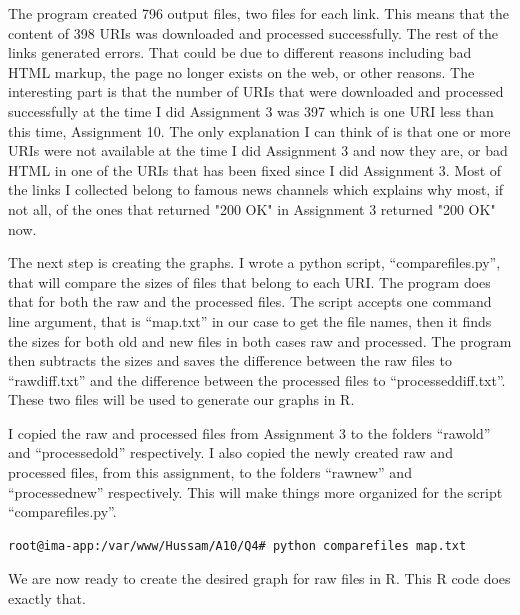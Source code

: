 \documentclass[a4paper, 11pt]{article}
\begin{document}
The program created 796 output files, two files for each link. This means that the content of 398 URIs was downloaded and processed successfully. The rest of the links generated errors. That could be due to different reasons including bad HTML markup, the page no longer exists on the web, or other reasons. The interesting part is that the number of URIs that were downloaded and processed successfully at the time I did Assignment 3 was 397 which is one URI less than this time, Assignment 10. The only explanation I can think of is that one or more URIs were not available at the time I did Assignment 3 and now they are, or bad HTML in one of the URIs that has been fixed since I did Assignment 3. Most of the links I collected belong to famous news channels which explains why most, if not all, of the ones that returned "200 OK" in Assignment 3 returned "200 OK" now.

The next step is creating the graphs. I wrote a python script, ``comparefiles.py'', that will compare the sizes of files that belong to each URI. The program does that for both the raw and the processed files. The script accepts one command line argument, that is ``map.txt'' in our case to get the file names, then it finds the sizes for both old and new files in both cases raw and processed. The program then subtracts the sizes and saves the difference between the raw files to ``rawdiff.txt'' and the difference between the processed files to ``processeddiff.txt''. These two files will be used to generate our graphs in R. 

I copied the raw and processed files from Assignment 3 to the folders ``rawold'' and ``processedold'' respectively. I also copied the newly created raw and processed files, from this assignment, to the folders ``rawnew'' and ``processednew'' respectively. This will make things more organized for the script ``comparefiles.py''. 



\begin{lstlisting}[language=bash, breakatwhitespace=〈false), label=running comparefiles.py, caption= Running comparefiles.py to create the files rawdiff.txt and processeddiff.txt to generate the graphs in R.]
root@ima-app:/var/www/Hussam/A10/Q4# python comparefiles map.txt
\end{lstlisting}

We are now ready to create the desired graph for raw files in R. This R code does exactly that.
\end{document}
